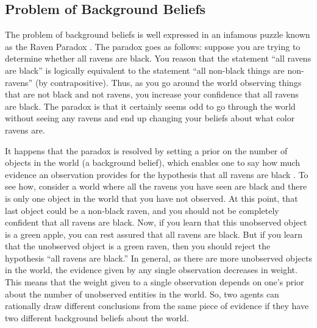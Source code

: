 \documentclass[11pt,a4paper]{article}
\begin{document}
\subsection{Problem of Background Beliefs}
\label{sec:problem_of_background_beliefs}

The problem of background beliefs is well expressed in an infamous puzzle known as the Raven Paradox \citep{hempel1945studies}. The paradox goes as follows: suppose you are trying to determine whether all ravens are black. You reason that the statement ``all ravens are black'' is logically equivalent to the statement ``all non-black things are non-ravens'' (by contrapositive). Thus, as you go around the world observing things that are not black and not ravens, you increase your confidence that all ravens are black. The paradox is that it certainly seems odd to go through the world without seeing any ravens and end up changing your beliefs about what color ravens are.

It happens that the paradox is resolved by setting a prior on the number of objects in the world (a background belief), which enables one to say how much evidence an observation provides for the hypothesis that all ravens are black \cite{fitelson2010bayesian}. To see how, consider a world where all the ravens you have seen are black and there is only one object in the world that you have not observed. At this point, that last object could be a non-black raven, and you should not be completely confident that all ravens are black. Now, if you learn that this unobserved object is a green apple, you can rest assured that all ravens are black. But if you learn that the unobserved object is a green raven, then you should reject the hypothesis ``all ravens are black.'' 
In general, as there are more unobserved objects in the world, the evidence given by any single observation decreases in weight. This means that the weight given to a single observation depends on one's prior about the number of unobserved entities in the world. So, two agents can rationally draw different conclusions from the same piece of evidence if they have two different background beliefs about the world.
\end{document}
